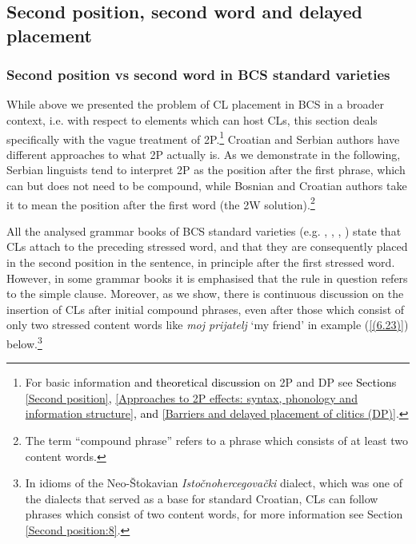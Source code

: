 \subsection[Second position, second word, and delayed placement]{Second position, second word and delayed placement}
\label{Second position, second word and delayed placement}

\subsubsection{Second position vs second word in BCS standard varieties}
\label{Second position vs second word in BCS standard varieties}
While above we presented the problem of CL placement in BCS in a broader context, i.e. with respect to elements which can host CLs, this section deals specifically with the vague treatment of 2P.\footnote{For basic information \textcolor{black}{and theoretical discussion} on 2P and DP see \textcolor{black}{Sections \ref{Second position}, \ref{Approaches to 2P effects: syntax, phonology and information structure}, and \ref{Barriers and delayed placement of clitics (DP)}}.} Croatian and Serbian authors have different approaches to what 2P actually is. As we demonstrate in the following, Serbian linguists tend to interpret 2P as the position after the first phrase, which can but does not need to be compound, while Bosnian and Croatian authors take it to mean the position after the first word (the 2W solution).\footnote{The term ``compound phrase'' refers to a phrase which consists of at least two content words.} 

All the analysed grammar books of BCS standard varieties (e.g. \citealt[495]{Katicic86}, \citealt[471]{JHP00}, \citealt[17]{Popovic04}, \citealt[29, 450]{PiperKlajn14}) state that CLs attach to the preceding stressed word, and that they are consequently placed in the second position in the sentence, in principle after the first stressed word. However, in some grammar books \citep[e.g][105]{PiperIvic05} it is emphasised that the rule in question refers to the simple clause. Moreover, as we show, there is continuous discussion on the insertion of CLs after initial compound phrases, even after those which consist of only two stressed content words like \textit{moj prijatelj} ‘my friend’ in example (\ref{(6.23)}) below.\footnote{In idioms of the Neo-Štokavian \textit{Istočnohercegovački} dialect, which was one of the dialects that served as a base for standard Croatian, CLs can follow phrases which consist of two content words, for more information see Section \ref{Second position:8}. }

